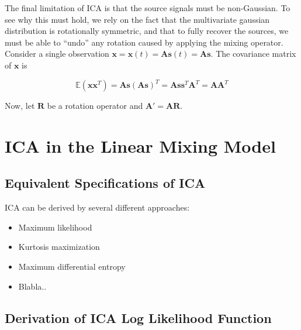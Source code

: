 \documentclass[11pt, oneside, a4paper]{report}
\begin{document}
The final limitation of ICA is that the source signals must be
non-Gaussian. To see why this must hold, we rely on the fact that the
multivariate gaussian distribution is rotationally symmetric, and that
to fully recover the sources, we must be able to ``undo'' any rotation
caused by applying the mixing operator. Consider a single observation
$\boldsymbol{x} = \boldsymbol{x}(t) =\boldsymbol{A}\boldsymbol{s}(t) = \boldsymbol{A}\boldsymbol{s}$. The covariance matrix of $\boldsymbol{x}$ is 

    \begin{equation}
      \mathbb{E}(\boldsymbol{x}\boldsymbol{x}^T) = \boldsymbol{A}\boldsymbol{s}(\boldsymbol{A}\boldsymbol{s})^T = \boldsymbol{A}\boldsymbol{s}\boldsymbol{s}^T\boldsymbol{A}^T=\boldsymbol{A}\boldsymbol{A}^T      
    \end{equation}

Now, let $\boldsymbol{R}$ be a rotation operator and $\boldsymbol{A}' = \boldsymbol{AR}$.






\section{ICA in the Linear Mixing Model}

\subsection{Equivalent Specifications of ICA}

ICA can be derived by several different approaches:
\begin{itemize}
  \item Maximum likelihood
  \item Kurtosis maximization
  \item Maximum differential entropy
  \item Blabla..
\end{itemize}



\subsection{Derivation of ICA Log Likelihood Function}\label{ml_ica}
\end{document}
